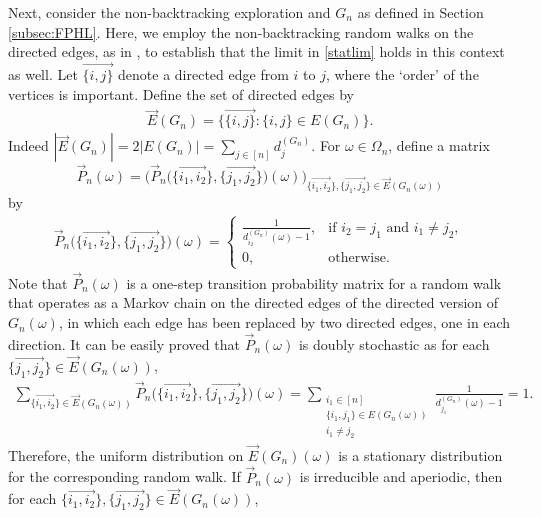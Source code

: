\documentclass[11pt]{article}
\numberwithin{equation}{section}
\theoremstyle{plain}
\newcommand{\dn}{d^{(G_{n})}}
\begin{document}
Next, consider the non-backtracking exploration and $G_{n}$ as defined in Section \ref{subsec:FPHL}. Here, we employ the non-backtracking random walks on the directed edges, as in \cite{K}, to establish that the limit in \eqref{statlim} holds in this context as well.
Let $\overset{\rightarrow}{\{i,j\}}$ denote a directed edge from $i$ to $j$, where the `order' of the vertices is important. Define the set of directed edges by
\begin{align*}
\vec{E}(G_{n}) = \Big\{\overset{\rightarrow}{\{i,j\}}: \{i,j\}\in E(G_{n})\Big\}.
\end{align*}
Indeed $|\vec{E}(G_{n})|=2|E(G_{n})|=\sum_{j\in [n]}\dn_{j}$. For $\omega\in \Omega_{n}$, define a matrix 
\[\vec{P}_{n}(\omega)=\Big(\vec{P}_{n}\big(\{\overset{\rightarrow}{i_{1},i_{2}}\},\{\overset{\rightarrow}{j_{1},j_{2}}\}\big)(\omega)\Big)_{\{\overset{\rightarrow}{i_{1},i_{2}}\},\{\overset{\rightarrow}{j_{1},j_{2}}\}\in\vec{E}(G_{n}(\omega))}\]
by
\begin{align*}
\vec{P}_{n}\big(\{\overset{\rightarrow}{i_{1},i_{2}}\},\{\overset{\rightarrow}{j_{1},j_{2}}\}\big)(\omega) = \left\{
\begin{array}{ll}
\frac{1}{\dn_{i_2}(\omega)-1}, & \text{if }i_{2}=j_{1}\text{ and }i_{1}\neq j_{2}, \\
0, & \text{otherwise}.
\end{array}
\right.
\end{align*}
Note that $\vec{P}_{n}(\omega)$ is a one-step transition probability matrix for a random walk that operates as a Markov chain on the directed edges of the directed version of $G_{n}(\omega)$, in which each edge has been replaced by two directed edges, one in each direction. It can be easily proved that $\vec{P}_{n}(\omega)$ is doubly stochastic as for each $\{\overset{\rightarrow}{j_{1},j_{2}}\}\in\vec{E}(G_{n}(\omega))$,
\begin{align*}
\sum_{\{\overset{\rightarrow}{i_{1},i_{2}}\}\in\vec{E}(G_{n}(\omega))}\vec{P}_{n}\big(\{\overset{\rightarrow}{i_{1},i_{2}}\},\{\overset{\rightarrow}{j_{1},j_{2}}\}\big)(\omega) 
=\sum_{\substack{i_1 \in [n] \\ \{i_1, j_1\} \in E(G_n(\omega)) \\ i_{1}\neq j_{2}}} \frac{1}{\dn_{j_1}(\omega)-1}=1.
\end{align*}
Therefore, the uniform distribution on $\vec{E}(G_{n})(\omega)$ is a stationary distribution for the corresponding random walk. If $\vec{P}_{n}(\omega)$ is irreducible and aperiodic, then for each $\{\overset{\rightarrow}{i_{1},i_{2}}\},\{\overset{\rightarrow}{j_{1},j_{2}}\}\in\vec{E}(G_{n}(\omega))$,
\end{document}
